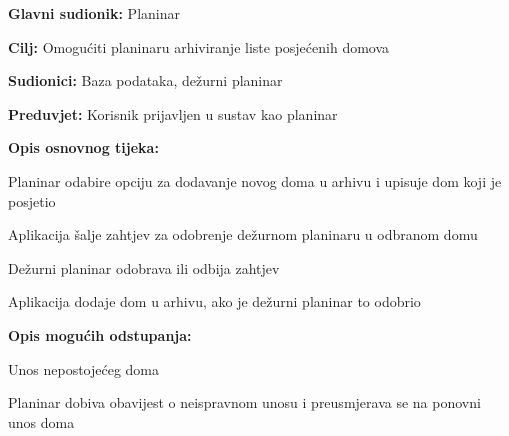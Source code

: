 	
			\noindent {}
		\begin{packed_item}
			
			\item \textbf{Glavni sudionik: }$ $Planinar$ $
			\item  \textbf{Cilj:} $ $Omogućiti planinaru arhiviranje liste posjećenih domova$ $
			\item  \textbf{Sudionici:} $ $Baza podataka, dežurni planinar$ $
			\item  \textbf{Preduvjet:} $ $Korisnik prijavljen u sustav kao planinar$ $
			\item  \textbf{Opis osnovnog tijeka:}
			
			\item[] \begin{packed_enum}
				
				\item $ $Planinar odabire opciju za dodavanje novog doma u arhivu i upisuje dom koji je posjetio$ $
				\item $ $Aplikacija šalje zahtjev za odobrenje dežurnom planinaru u odbranom domu$ $
				\item $ $Dežurni planinar odobrava ili odbija zahtjev$ $	
				\item $ $Aplikacija dodaje dom u arhivu, ako je dežurni planinar to odobrio$ $
			\end{packed_enum}
			\item  \textbf{Opis mogućih odstupanja:}
			
			\item[] \begin{packed_item}
				
				\item[1.a] $ $Unos nepostojećeg doma$ $
				\item[] \begin{packed_enum}
					
					\item $ $Planinar dobiva obavijest o neispravnom unosu i preusmjerava se na ponovni unos doma$ $
				\end{packed_enum}
			\end{packed_item}
		\end{packed_item}
	
